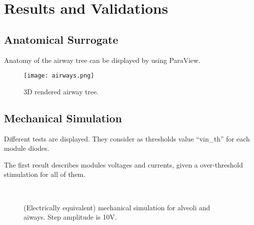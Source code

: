 \section{Results and Validations}
\label{sec:results_and_validations}



\subsection{Anatomical Surrogate}
\label{subsec:anatomical_results}

Anatomy of the airway tree can be displayed by using ParaView.
\begin{figure}[H]\centering
  \texttt{[image: airways.png]}
  \caption{3D rendered airway tree.}
  \label{fig:airways_results}
\end{figure}

\subsection{Mechanical Simulation}
\label{subsec:mechanical_results}


Different tests are displayed.  They consider as thresholds value
``vin\_th'' for each module diodes.

The first result describes modules voltages and currents, given a
over-threshold stimulation for all of them.


\begin{figure}[H]\centering
    \\
    
  \caption{(Electrically equivalent) mechanical simulation for alveoli
    and aiways.  Step amplitude is 10V.}
  \label{fig:mechanical_results_above}
\end{figure}

